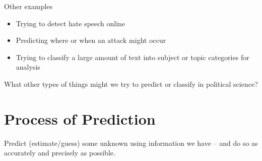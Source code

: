 \documentclass[
  letterpaper,
  DIV=11,
  numbers=noendperiod]{scrreprt}
\providecommand{\tightlist}{%
  \setlength{\itemsep}{0pt}\setlength{\parskip}{0pt}}\usepackage{longtable,booktabs,array}
\begin{document}
Other examples

\begin{itemize}
\tightlist
\item
  Trying to detect hate speech online
\item
  Predicting where or when an attack might occur
\item
  Trying to classify a large amount of text into subject or topic
  categories for analysis
\end{itemize}

What other types of things might we try to predict or classify in
political science?

\hypertarget{process-of-prediction}{%
\section{Process of Prediction}\label{process-of-prediction}}

Predict (estimate/guess) some unknown using information we have -- and
do so as accurately and precisely as possible.
\end{document}
